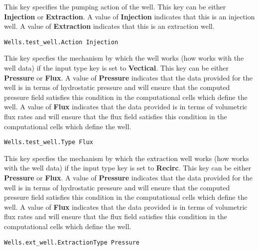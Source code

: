{
This key specifies the pumping action of the well.  This key can be
either {\bf Injection} or {\bf Extraction}.  A value of {\bf Injection}
indicates that this is an injection well.  A value of {\bf Extraction}
indicates that this is an extraction well.
}
\begin{display}\begin{verbatim}
Wells.test_well.Action Injection
\end{verbatim}\end{display}

{
This key specfies the mechanism by which the well works (how \parflow{}
works with the well data) if the input type key is set to {\bf Vectical}.
This key can be either {\bf Pressure} or {\bf Flux}.  A value of
{\bf Pressure} indicates that the data provided for the well is in terms
of hydrostatic pressure and \parflow{} will ensure that the computed
pressure field satisfies this condition in the computational cells which
define the well.  A value of {\bf Flux} indicates that the data provided
is in terms of volumetric flux rates and \parflow{} will ensure that the
flux field satisfies this condition in the computational cells which
define the well.
}
\begin{display}\begin{verbatim}
Wells.test_well.Type Flux
\end{verbatim}\end{display}

{
This key specfies the mechanism by which the extraction well works (how
\parflow{} works with the well data) if the input type key is set to
{\bf Recirc}.  This key can be either {\bf Pressure} or {\bf Flux}.  A
value of {\bf Pressure} indicates that the data provided for the well is
in terms of hydrostatic pressure and \parflow{} will ensure that the
computed pressure field satisfies this condition in the computational
cells which define the well.  A value of {\bf Flux} indicates that the
data provided is in terms of volumetric flux rates and \parflow{} will
ensure that the flux field satisfies this condition in the computational
cells which define the well.
}
\begin{display}\begin{verbatim}
Wells.ext_well.ExtractionType Pressure
\end{verbatim}\end{display}

